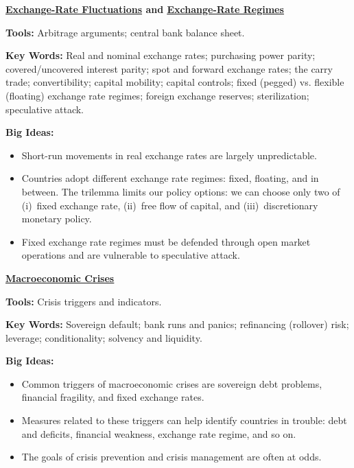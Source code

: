 \textbf{\hyperref[chp:fxf]{\underline{Exchange-Rate Fluctuations}} and \hyperref[chp:fxr]{\underline{Exchange-Rate Regimes}}}

\textbf{Tools:} Arbitrage arguments; central bank balance sheet.

\textbf{Key Words:} Real and nominal exchange rates; purchasing power parity; covered/uncovered interest parity;
spot and forward exchange rates; the carry trade; convertibility; capital mobility; capital controls; fixed (pegged) vs. flexible (floating) exchange rate regimes; foreign exchange reserves; sterilization; speculative attack.

\textbf{Big Ideas:}
\vspace{-0.1in}
\begin{itemize}
\item Short-run movements in real exchange rates are largely unpredictable.
\item Countries adopt different exchange rate regimes:  fixed, floating, and in between.
The trilemma limits our policy options:  we can choose only two of
(i)~fixed exchange rate, (ii)~free flow of capital,
and (iii)~discretionary monetary policy.
\item Fixed exchange rate regimes must be defended through open market operations and are vulnerable to speculative attack.
\end{itemize}

\textbf{\hyperref[chp:cris]{\underline{Macroeconomic Crises}}}

\textbf{Tools:} Crisis triggers and indicators.

\textbf{Key Words:} Sovereign default; bank runs and panics; refinancing (rollover) risk; leverage; conditionality;
solvency and liquidity.

\textbf{Big Ideas:}
\vspace{-0.1in}
\begin{itemize}
\item Common triggers of macroeconomic crises are sovereign debt problems, financial fragility,
and fixed exchange rates.

\item Measures related to these triggers can help identify countries in trouble:
debt and deficits, financial weakness, exchange rate regime, and so on.

\item The goals of crisis prevention and crisis management are often at odds.
\end{itemize}
